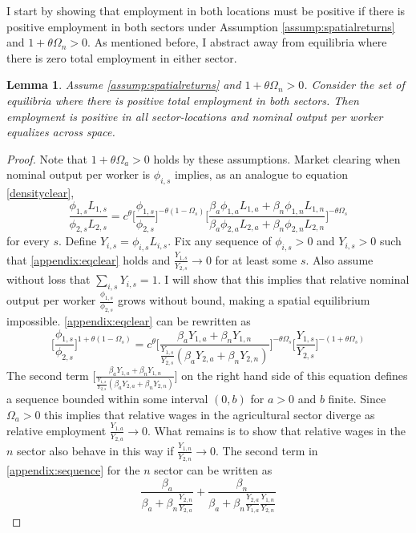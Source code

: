 \documentclass[]{article}
\theoremstyle{plain}
\newtheorem{lem}[thm]{Lemma}
\begin{document}
I start by showing that employment in both locations must be positive if there is positive employment in both sectors under Assumption \ref{assump:spatialreturns} and $1 + \theta\Omega_{n} > 0$. As mentioned before, I abstract away from equilibria where there is zero total employment in either sector. 
\begin{lem}
	Assume \ref{assump:spatialreturns} and $1 + \theta\Omega_{n} > 0$. Consider the set of equilibria where there is positive total employment in both sectors. Then employment is positive in all sector-locations and nominal output per worker equalizes across space.
\end{lem}
\begin{proof}
 Note that $1 + \theta\Omega_{a} > 0$ holds by these assumptions. Market clearing when nominal output per worker is $\phi_{i,s}$ implies, as an analogue to equation \eqref{densityclear},
\begin{equation}\label{appendix:eqclear}
	\frac{\phi_{1, s}L_{1, s}}{\phi_{2, s}L_{2, s}} = c^{\theta}\bigg[\frac{\phi_{1,s}}{\phi_{2,s}}\bigg]^{-\theta(1-\Omega_{s})}\bigg[\frac{\beta_{a}\phi_{1,a}L_{1, a} + \beta_{n}\phi_{1,n}L_{1, n}}{\beta_{a}\phi_{2,a}L_{2, a} + \beta_{n}\phi_{2,n}L_{2, n}}\bigg]^{-\theta\Omega_{s}}
\end{equation}
for every $s$. Define $Y_{i, s} = \phi_{i, s}L_{i, s}$. Fix any sequence of $\phi_{i, s} > 0$ and $Y_{i,s} > 0$ such that \eqref{appendix:eqclear} holds and $\frac{Y_{1, s}}{Y_{2, s}} \to 0$ for at least some $s$. Also assume without loss that $\sum_{i, s}Y_{i, s} = 1$. I will show that this implies that relative nominal output per worker $\frac{\phi_{1,s}}{\phi_{2,s}}$ grows without bound, making a spatial equilibrium impossible. \eqref{appendix:eqclear} can be rewritten as 
\begin{equation}\label{appendix:sequence}
	\bigg[\frac{\phi_{1,s}}{\phi_{2, s}}\bigg]^{1+\theta(1-\Omega_{s})} = c^{\theta}\bigg[\frac{\beta_{a}Y_{1, a} + \beta_{n}Y_{1, n}}{\frac{Y_{1,s}}{Y_{2, s}}(\beta_{a}Y_{2, a} + \beta_{n}Y_{2, n})}\bigg]^{-\theta\Omega_{s}}\bigg[\frac{Y_{1,s}}{Y_{2, s}}\bigg]^{-(1+\theta\Omega_{s})}
\end{equation}
The second term $\bigg[\frac{\beta_{a}Y_{1, a} + \beta_{n}Y_{1, n}}{\frac{Y_{1,s}}{Y_{2, s}}(\beta_{a}Y_{2, a} + \beta_{n}Y_{2, n})}\bigg]$ on the right hand side of this equation defines a sequence bounded within some interval $(0, b)$ for $a > 0$ and $b$ finite. Since $\Omega_{a} > 0$ this implies that relative wages in the agricultural sector diverge as relative employment $\frac{Y_{1, a}}{Y_{2, a}} \to 0$. What remains is to show that relative wages in the $n$ sector also behave in this way if $\frac{Y_{1, n}}{Y_{2, n}} \to 0$. The second term in \eqref{appendix:sequence} for the $n$ sector can be written as
\begin{equation*}
	\frac{\beta_{a}}{\beta_{a} + \beta_{n}\frac{Y_{2, n}}{Y_{2, a}}} + \frac{\beta_{n}}{\beta_{a} + \beta_{n}\frac{Y_{2, a}}{Y_{1, a}}\frac{Y_{1, n}}{Y_{2, n}}}
\end{equation*}

\end{proof}
\end{document}
